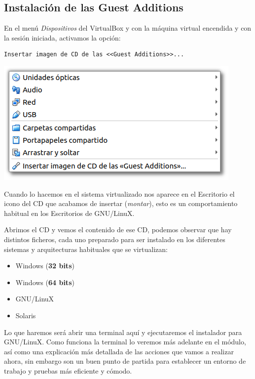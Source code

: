 \documentclass[11pt]{article}
\begin{document}
\subsection{Instalación de las Guest Additions}
\label{sec:orgcc2165b}
En el menú \emph{Dispositivos} del VirtualBox y con la máquina virtual
encendida y con la sesión iniciada, activamos la opción:

\begin{verbatim}
Insertar imagen de CD de las <<Guest Additions>>...
\end{verbatim}

\begin{center}
\includegraphics[width=.9\linewidth]{imgs/VBox_GuestAdd_LinuX_004.png}
\end{center}

Cuando lo hacemos en el sistema virtualizado nos aparece en el
Escritorio el icono del CD que acabamos de insertar (\emph{montar}), esto es
un comportamiento habitual en los Escritorios de GNU/LinuX.

Abrimos el CD y vemos el contenido de ese CD, podemos observar que hay
distintos ficheros, cada uno preparado para ser instalado en los
diferentes sistemas y arquitecturas habituales que se virtualizan:

\begin{itemize}
\item Windows (\textbf{32 bits})
\item Windows (\textbf{64 bits})
\item GNU/LinuX
\item Solaris
\end{itemize}

Lo que haremos será abrir una terminal aquí y ejecutaremos el instalador
para GNU/LinuX. Como funciona la terminal lo veremos más adelante en el
módulo, así como una explicación más detallada de las acciones que vamos
a realizar ahora, sin embargo son un buen punto de partida para
establecer un entorno de trabajo y pruebas más eficiente y cómodo.
\end{document}
